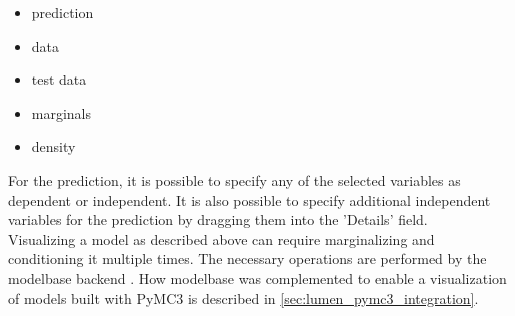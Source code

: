 \documentclass{article}
\begin{document}
\begin{itemize}
	\item prediction
	\item data
	\item test data
	\item marginals
	\item density
\end{itemize}
For the prediction, it is possible to specify any of the selected variables as dependent or independent. It is also possible to specify additional independent variables for the prediction by dragging them into the 'Details' field.
\\
Visualizing a model as described above can require marginalizing and conditioning it multiple times. The necessary operations are performed by the modelbase backend \cite{Lucas2016b}. How modelbase was complemented to enable a visualization of models built with PyMC3 is described in \autoref{sec:lumen_pymc3_integration}.





\end{document}

